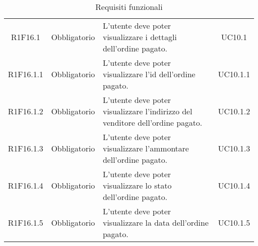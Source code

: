 \begin{table}[H]
\begin{tabular}{c | c | p{6cm} | c}
        R1F16.1                                                           & Obbligatorio & L'utente deve poter visualizzare i dettagli dell'ordine pagato.                                                              & UC10.1   \\
        R1F16.1.1                                                           & Obbligatorio & L'utente deve poter visualizzare l'id dell'ordine pagato.                                                                    & UC10.1.1 \\
        R1F16.1.2                                                           & Obbligatorio & L'utente deve poter visualizzare l'indirizzo del venditore dell'ordine pagato.                                               & UC10.1.2 \\
        R1F16.1.3                                                           & Obbligatorio & L'utente deve poter visualizzare l'ammontare dell'ordine pagato.                                                             & UC10.1.3 \\
        R1F16.1.4                                                           & Obbligatorio & L'utente deve poter visualizzare lo stato dell'ordine pagato.                                                                & UC10.1.4 \\
        R1F16.1.5                                                           & Obbligatorio & L'utente deve poter visualizzare la data dell'ordine pagato.                                                                 & UC10.1.5 \\
    \end{tabular}
    \caption{Requisiti funzionali}
\end{table}


